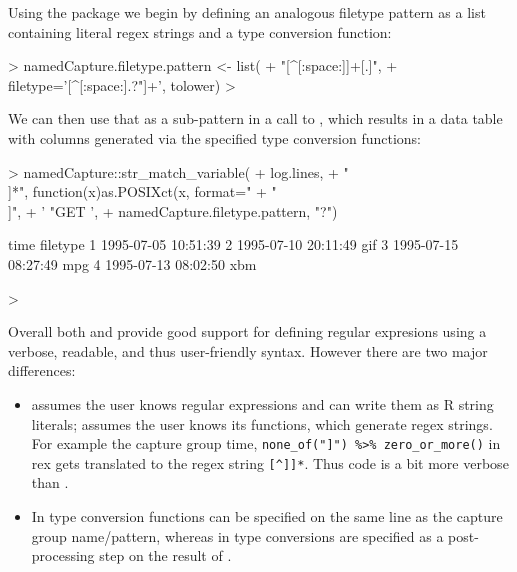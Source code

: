 Using the  package we begin by defining an analogous
filetype pattern as a list containing literal regex strings and a type
conversion function:

\begin{Schunk}
\begin{Sinput}
> namedCapture.filetype.pattern <- list(
+   "[^[:space:]]+[.]", 
+   filetype='[^[:space:].?"]+', tolower)
> 
\end{Sinput}
\end{Schunk}

We can then use that as a sub-pattern in a call to
, which results in a data table with columns
generated via the specified type conversion functions:

\begin{Schunk}
\begin{Sinput}
> namedCapture::str_match_variable(
+   log.lines,
+   "\\[",
+   time="[^]]*", function(x)as.POSIXct(x, format="%d/%b/%Y:%H:%M:%S %z"),
+   "\\]",
+   ' "GET ',
+   namedCapture.filetype.pattern, "?")
\end{Sinput}
\begin{Soutput}
                 time filetype
1 1995-07-05 10:51:39         
2 1995-07-10 20:11:49      gif
3 1995-07-15 08:27:49      mpg
4 1995-07-13 08:02:50      xbm
\end{Soutput}
\begin{Sinput}
> 
\end{Sinput}
\end{Schunk}

Overall both  and  provide good
support for defining regular expresions using a verbose, readable, and
thus user-friendly syntax. However there are two major differences:
\begin{itemize}
\item {} assumes the user knows regular
  expressions and can write them as R string literals; 
  assumes the user knows its functions, which generate regex
  strings. For example the capture group time,
  \verb|none_of("]") %>% zero_or_more()| in rex gets translated to the
  regex string \verb|[^]]*|. Thus  code is a bit more verbose than
  .
\item In  type conversion functions can be specified on the
  same line as the capture group name/pattern, whereas in  type conversions are
  specified as a post-processing step on the result of . 
\end{itemize}

